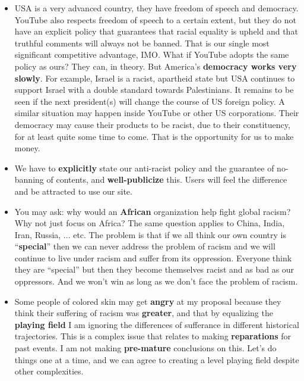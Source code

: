 \begin{preview}
\begin{minipage}{\textwidth}
\begin{itemize}
	\item USA is a very advanced country, they have freedom of speech and democracy.  YouTube also respects freedom of speech to a certain extent, but they do not have an explicit policy that guarantees that racial equality is upheld and that truthful comments will always not be banned.  That is our single most significant competitive advantage, IMO.  What if YouTube adopts the same policy as ours?  They can, in theory.  But America's \textbf{democracy works very slowly}.  For example, Israel is a racist, apartheid state but USA continues to support Israel with a double standard towards Palestinians.  It remains to be seen if the next president(s) will change the course of US foreign policy.  A similar situation may happen inside YouTube or other US corporations.  Their democracy may cause their products to be racist, due to their constituency, for at least quite some time to come.  That is the opportunity for us to make money.
	\item We have to \textbf{explicitly} state our anti-racist policy and the guarantee of no-banning of contents, and \textbf{well-publicize} this.  Users will feel the difference and be attracted to use our site.
	\item You may ask:  why would an \textbf{African} organization help fight global racism?  Why not just focus on Africa?  The same question applies to China, India, Iran, Russia, ... etc.  The problem is that if we all think our own country is ``\textbf{special}'' then we can never address the problem of racism and we will continue to live under racism and suffer from its oppression.  Everyone think they are ``special'' but then they become themselves racist and as bad as our oppressors.  And we won't win as long as we don't face the problem of racism.
	\item Some people of colored skin may get \textbf{angry} at my proposal because they think their suffering of racism was \textbf{greater}, and that by equalizing the \textbf{playing field} I am ignoring the differences of sufferance in different historical trajectories.  This is a complex issue that relates to making \textbf{reparations} for past events.  I am not making \textbf{pre-mature} conclusions on this.  Let's do things one at a time, and we can agree to creating a level playing field despite other complexities.
\end{itemize}

\end{minipage}
\end{preview}

